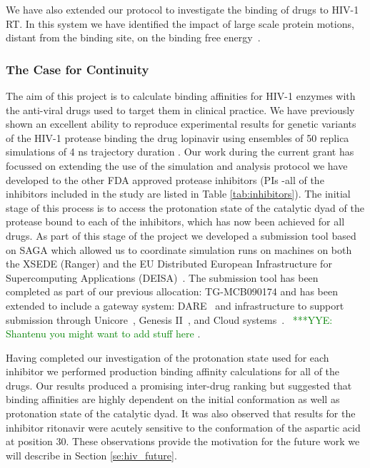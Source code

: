 \documentclass[a4paper,10pt]{article}
\newcommand{\yyenote}[1]{ {\textcolor{green} { ***YYE: #1 }}}
\newcommand{\yyenote}[1]{ {}}
\begin{document}
We have also extended our protocol to investigate the binding of drugs to HIV-1 RT. In this system we have identified the impact of large scale protein motions, distant from the binding site, on the binding free energy~\cite{Ref4}.


\subsubsection{The Case for Continuity}

The aim of this project is to calculate binding affinities for HIV-1 enzymes with the anti-viral 
drugs used to target them in clinical practice. We have previously shown an excellent ability to
reproduce experimental results for genetic variants of the HIV-1 protease binding the drug 
lopinavir using ensembles of 50 replica simulations of 4 ns trajectory duration \cite{Sadiq2010}. 
Our work during the current grant has focussed on extending the use of the simulation and analysis 
protocol we have developed to the other FDA approved protease inhibitors (PIs -all of the inhibitors 
included in the study are listed in Table \ref{tab:inhibitors}). 
The initial stage of this process is to access the protonation state of the catalytic dyad of the 
protease bound to each of the inhibitors, which has now been achieved for all drugs. As part of this 
stage of the project we developed a submission tool based on SAGA which allowed us 
to coordinate simulation runs on machines on both the XSEDE (Ranger) and the EU Distributed 
European Infrastructure for Supercomputing Applications (DEISA)~\cite{DEISA}. The submission tool has been completed
as part of our previous allocation: TG-MCB090174 and has been extended to include a gateway
system: DARE~\cite{DARE} and infrastructure to support submission through Unicore~\cite{UNICORE},
Genesis II~\cite{genesis2}, and Cloud systems~\cite{SAGA-Eucalyptus}.~\yyenote{Shantenu you might want
to add stuff here}. 

Having completed our investigation 
of the protonation state used for each inhibitor we performed production binding affinity calculations 
for all of the drugs. Our results produced a promising inter-drug ranking but 
suggested that binding affinities are highly dependent on the initial conformation as well as protonation 
state of the catalytic dyad. It was also observed that results for the inhibitor ritonavir were acutely 
sensitive to the conformation of the aspartic acid at position 30. These observations provide the 
motivation for the future work we will describe in Section \ref{se:hiv_future}.
\end{document}
